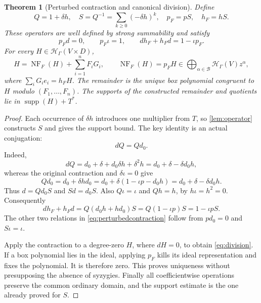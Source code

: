 \documentclass[11pt,letterpaper]{article}
\newtheorem{theorem}{Theorem}[section]
\theoremstyle{definition}
\theoremstyle{remark}
\newcommand{\HH}{\mathcal H}
\newcommand{\BB}{\mathcal B}
\newcommand{\supp}{\operatorname{supp}}
\newcommand{\NF}{\operatorname{NF}}
\numberwithin{equation}{section}
\begin{document}
\begin{theorem}[Perturbed contraction and canonical division]\label{thm:division}
Define
\begin{equation}\label{eq:perturbedops}
 Q=1+\delta h,\quad
 S=Q^{-1}=\sum_{k\ge0}(-\delta h)^k,\quad
 p_F=pS,\quad h_F=hS.
\end{equation}
These operators are well defined by strong summability and satisfy
\begin{equation}\label{eq:perturbedcontraction}
 p_Fd=0,\qquad p_F\iota=1,\qquad
 dh_F+h_Fd=1-\iota p_F.
\end{equation}
For every $H\in\HH_\Gamma(V\times D)$,
\begin{equation}\label{eq:division}
 H=\NF_F(H)+\sum_{i=1}^nF_iG_i,\qquad
 \NF_F(H)=p_FH\in\bigoplus_{\alpha\in\BB}\HH_\Gamma(V)z^\alpha,
\end{equation}
where $\sum_iG_ie_i=h_FH$. The remainder is the unique box polynomial congruent to $H$ modulo $(F_1,\ldots,F_n)$. The supports of the constructed remainder and quotients lie in $\supp(H)+T^*$.
\end{theorem}
\begin{proof}
Each occurrence of $\delta h$ introduces one multiplier from $T$, so \cref{lem:operator} constructs $S$ and gives the support bound. The key identity is an actual conjugation:
\begin{equation}\label{eq:conjugation}
 dQ=Qd_0.
\end{equation}
Indeed,
\[
 dQ=d_0+\delta+d_0\delta h+\delta^2h
     =d_0+\delta-\delta d_0h,
\]
whereas the original contraction and $\delta\iota=0$ give
\[
 Qd_0=d_0+\delta hd_0
      =d_0+\delta(1-\iota p-d_0h)
      =d_0+\delta-\delta d_0h.
\]
Thus $d=Qd_0S$ and $Sd=d_0S$. Also $Q\iota=\iota$ and $Qh=h$, by $h\iota=h^2=0$. Consequently
\[
 dh_F+h_Fd
 =Q(d_0h+hd_0)S
 =Q(1-\iota p)S
 =1-\iota pS.
\]
The other two relations in \eqref{eq:perturbedcontraction} follow from $pd_0=0$ and $S\iota=\iota$.

Apply the contraction to a degree-zero $H$, where $dH=0$, to obtain \eqref{eq:division}. If a box polynomial lies in the ideal, applying $p_F$ kills its ideal representation and fixes the polynomial. It is therefore zero. This proves uniqueness without presupposing the absence of syzygies. Finally all coefficientwise operations preserve the common ordinary domain, and the support estimate is the one already proved for $S$.
\end{proof}
\end{document}
